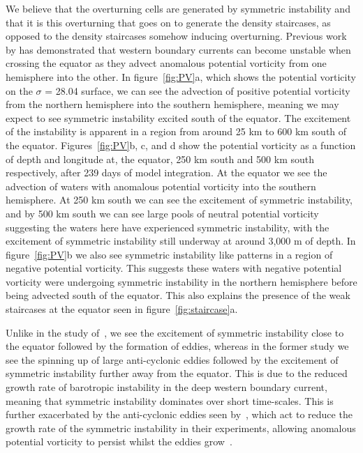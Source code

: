 We believe that the overturning cells are generated by symmetric instability and that it is this overturning that goes on to generate the density staircases, as opposed to the density staircases somehow inducing overturning. Previous work by \citet{Goldsworth2021} has demonstrated that western boundary currents can become unstable when crossing the equator as they advect anomalous potential vorticity from one hemisphere into the other. In figure~\ref{fig:PV}a, which shows the potential vorticity on the $\sigma$ = 28.04 surface, we can see the advection of positive potential vorticity from the northern hemisphere into the southern hemisphere, meaning we may expect to see symmetric instability excited south of the equator. The excitement of the instability is apparent in a region from around 25 km to 600 km south of the equator. Figures~\ref{fig:PV}b, c, and d show the potential vorticity as a function of depth and longitude at, the equator, 250 km south and 500 km south respectively, after 239 days of model integration. At the equator we see the advection of waters with anomalous potential vorticity into the southern hemisphere. At 250 km south we can see the excitement of symmetric instability, and by 500 km south we can see large pools of neutral potential vorticity suggesting the waters here have experienced symmetric instability, with the excitement of symmetric instability still underway at around 3,000 m of depth. In figure~\ref{fig:PV}b we also see symmetric instability like patterns in a region of negative potential vorticity. This suggests these waters with negative potential vorticity were undergoing symmetric instability in the northern hemisphere  before being advected south of the equator. This also explains the presence of the weak staircases at the equator seen in figure~\ref{fig:staircase}a.

Unlike in the study of~\cite{Goldsworth2021}, we see the excitement of symmetric instability close to the equator followed by the formation of eddies, whereas in the former study we see the spinning up of large anti-cyclonic eddies followed by the excitement of symmetric instability further away from the equator. This is due to the reduced growth rate of barotropic instability in the deep western boundary current, meaning that symmetric instability dominates over short time-scales. This is further exacerbated by the anti-cyclonic eddies seen by~\cite{Goldsworth2021}, which act to reduce the growth rate of the symmetric instability in their experiments, allowing anomalous potential vorticity to persist whilst the eddies grow~\cite{Buckingham2021}. 

